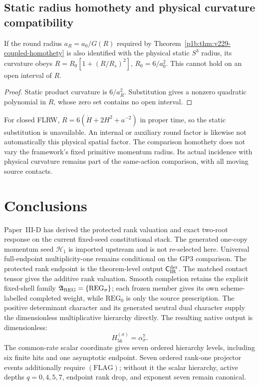 \documentclass[12pt,a4paper]{article}
\begin{document}
\subsection{Static radius homothety and physical curvature compatibility}
\label{p3d:sec:v229-radius-curvature}
\begin{proposition}
\label{p3d:prop:v229-static-radius-test}
If the round radius $a_R=a_0/G(R)$ required by
Theorem~\ref{p1b:thm:v229-coupled-homothety} is also identified with
the physical static $S^3$ radius, its curvature obeys
$R=R_0[1+(R/R_s)^2]$, $R_0=6/a_0^2$.
This cannot hold on an open interval of $R$.
\end{proposition}
\begin{proof}
Static product curvature is $6/a_R^2$. Substitution gives a nonzero
quadratic polynomial in $R$, whose zero set contains no open interval.
\end{proof}
For closed FLRW, $R=6(\dot H+2H^2+a^{-2})$ in proper time, so the
static substitution is unavailable. An internal or auxiliary round
factor is likewise not automatically this physical spatial factor.
The comparison homothety does not vary the framework's fixed primitive
momentum radius. Its actual incidence with physical curvature remains
part of the same-action comparison, with all moving source contacts.


\section{Conclusions}
\label{paper3d:sec:organized-conclusion}
\label{p3d:sec:conclusion}
Paper~III-D has derived the protected rank valuation and exact two-root
response on the current fixed-seed constitutional stack.  The generated one-copy momentum seed \(\mathcal H_1\) is imported
upstream and is not re-selected here.  Universal full-endpoint
multiplicity-one remains conditional on the GP3 comparison.  The protected rank endpoint is
the theorem-level output
\(\mathsf C_{\rm IR}^{\rm der}\).  The matched
contact tensor gives the additive rank valuation.  Smooth completion retains
the explicit fixed-shell family
\(\mathfrak A_{\rm REG}=\{\mathrm{REG}_\sigma\}\); each frozen member gives
its own scheme-labelled completed weight, while \(\mathrm{REG}_0\) is only
the source prescription.  The positive determinant character and its
generated neutral dual character supply the dimensionless multiplicative
hierarchy directly.  The resulting native output is
dimensionless:
\[
 H_{56}^{(\sigma)}=\alpha_\sigma^{7}.
\]
The common-rate scalar coordinate gives seven ordered hierarchy levels,
including six finite hits and one asymptotic endpoint.  Seven ordered
rank-one projector events additionally require \((\mathrm{FLAG})\); without
it the scalar hierarchy, active depths \(q=0,4,5,7\), endpoint rank drop, and
exponent seven remain canonical.
\end{document}
